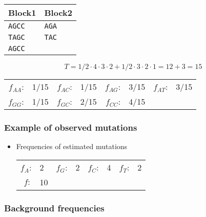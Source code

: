 \begin{table}[H]
\centering
\begin{tabular}{|l|l|}
\hline
Block1 & Block2 \\ \hline
\verb|AGCC|   & \verb|AGA|    \\ \hline
\verb|TAGC|   & \verb|TAC|    \\ \hline
\verb|AGCC|   &        \\ \hline
\end{tabular}
\end{table}

\[
T=1/2 \cdot 4 \cdot 3 \cdot 2+ 1/2 \cdot 3 \cdot 2 \cdot 1 = 12 + 3 = 15
\]

\begin{table}[H]
\centering
\begin{tabular}{|rl|rl|rl|rl|}
\hline
$f_{AA}$: & 1/15  & $f_{AC}$: & 1/15 & $f_{AG}$: & 3/15 & $f_{AT}$: & 3/15 \\ \arrayrulecolor{lightgray} \hline \arrayrulecolor{black} 
$f_{GG}$: & 1/15  & $f_{GC}$: & 2/15 & $f_{CC}$: & 4/15 &  &    \\ \hline
\end{tabular}
\end{table}

%
%
\subsubsection*{Example of observed mutations}

\begin{itemize}

\item Frequencies of estimated mutations

\begin{table}[H]
\centering
\begin{tabular}{|rl|rl|rl|rl|}
\hline
$f_A$: & 2  & $f_G$: & 2 & $f_C$: & 4 & $f_T$: & 2  \\ \arrayrulecolor{lightgray} \hline \arrayrulecolor{black} 
$f:$ & 10 &   &   &  &   &  &   \\ \hline
\end{tabular}
\end{table}

\end{itemize}

%
%
\subsubsection*{Background frequencies}


